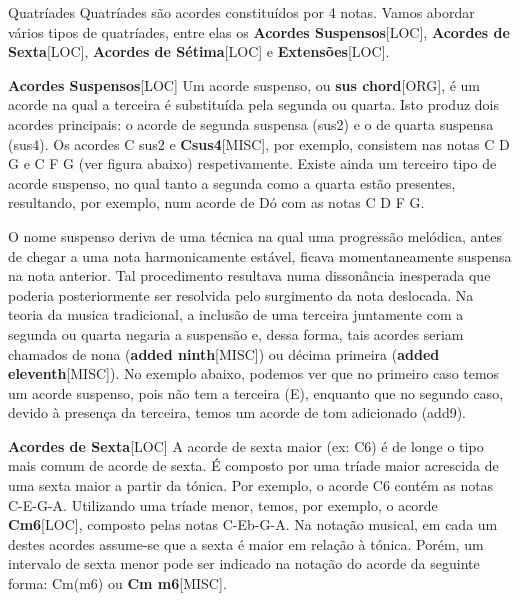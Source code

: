 \documentclass[a4paper,12pt]{article}
\begin{document}
Quatríades Quatríades são acordes constituídos por 4 notas. Vamos abordar vários tipos de quatríades, entre elas os \textbf{Acordes Suspensos}\textsc{[LOC]}, \textbf{Acordes de Sexta}\textsc{[LOC]}, \textbf{Acordes de Sétima}\textsc{[LOC]} e \textbf{Extensões}\textsc{[LOC]}.

\textbf{Acordes Suspensos}\textsc{[LOC]} Um acorde suspenso, ou \textbf{sus chord}\textsc{[ORG]}, é um acorde na qual a terceira é substituída pela segunda ou quarta. Isto produz dois acordes principais: o acorde de segunda suspensa (sus2) e o de quarta suspensa (sus4). Os acordes C sus2 e \textbf{Csus4}\textsc{[MISC]}, por exemplo, consistem nas notas C D G e C F G (ver figura abaixo) respetivamente. Existe ainda um terceiro tipo de acorde suspenso, no qual tanto a segunda como a quarta estão presentes, resultando, por exemplo, num acorde de Dó com as notas C D F G.

O nome suspenso deriva de uma técnica na qual uma progressão melódica, antes de chegar a uma nota harmonicamente estável, ficava momentaneamente suspensa na nota anterior. Tal procedimento resultava numa dissonância inesperada que poderia posteriormente ser resolvida pelo surgimento da nota deslocada. Na teoria da musica tradicional, a inclusão de uma terceira juntamente com a segunda ou quarta negaria a suspensão e, dessa forma, tais acordes seriam chamados de nona (\textbf{added ninth}\textsc{[MISC]}) ou décima primeira (\textbf{added eleventh}\textsc{[MISC]}). No exemplo abaixo, podemos ver que no primeiro caso temos um acorde suspenso, pois não tem a terceira (E), enquanto que no segundo caso, devido à presença da terceira, temos um acorde de tom adicionado (add9).

\textbf{Acordes de Sexta}\textsc{[LOC]} A acorde de sexta maior (ex: C6) é de longe o tipo mais comum de acorde de sexta. É composto por uma tríade maior acrescida de uma sexta maior a partir da tónica. Por exemplo, o acorde C6 contém as notas C-E-G-A. Utilizando uma tríade menor, temos, por exemplo, o acorde \textbf{Cm6}\textsc{[LOC]}, composto pelas notas C-Eb-G-A. Na notação musical, em cada um destes acordes assume-se que a sexta é maior em relação à tónica. Porém, um intervalo de sexta menor pode ser indicado na notação do acorde da seguinte forma: Cm(m6) ou \textbf{Cm m6}\textsc{[MISC]}.
\end{document}
